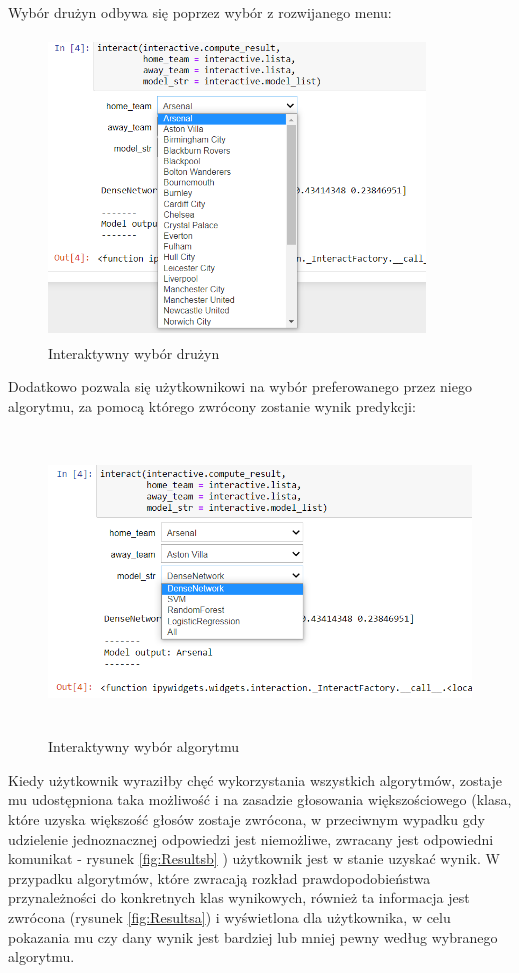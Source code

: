 Wybór drużyn odbywa się poprzez wybór z rozwijanego menu:
\begin{figure}[H] 
        \centering\includegraphics[width=10cm,height=8cm]{figures/Interactive_team_selection.png}
        \caption{Interaktywny wybór drużyn}\label{interactive_tem}
\end{figure}
Dodatkowo pozwala się użytkownikowi na wybór preferowanego przez niego algorytmu, za pomocą którego zwrócony zostanie wynik predykcji:
\begin{figure}[H] 
        \centering\includegraphics[width=12cm,height=8cm]{figures/Interactive_alg_selection.png}
        \caption{Interaktywny wybór algorytmu}\label{interactive_alg}
\end{figure}
Kiedy użytkownik wyraziłby chęć wykorzystania wszystkich algorytmów, zostaje mu udostępniona taka możliwość i na zasadzie głosowania większościowego (klasa, które uzyska większość głosów zostaje zwrócona, w przeciwnym wypadku gdy udzielenie jednoznacznej odpowiedzi jest niemożliwe, zwracany jest odpowiedni komunikat - rysunek \ref{fig:Resultsb} ) użytkownik jest w stanie uzyskać wynik. W przypadku algorytmów, które zwracają rozkład prawdopodobieństwa przynależności do konkretnych klas wynikowych, również ta informacja jest zwrócona (rysunek \ref{fig:Resultsa}) i wyświetlona dla użytkownika, w celu pokazania mu czy dany wynik jest bardziej lub mniej pewny według wybranego algorytmu. 

